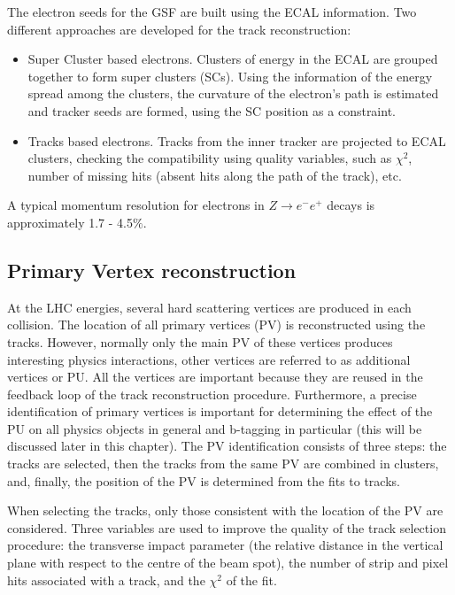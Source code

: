 The electron seeds for the GSF are built using the ECAL information. Two different approaches are developed for the track reconstruction:

\begin{itemize}

\item Super Cluster based electrons. Clusters of energy in the ECAL are grouped together to form super clusters (SCs). Using the information of the energy spread among the clusters, the curvature of the electron's path is estimated and tracker seeds are formed, using the SC position as a constraint. 
\item Tracks based electrons. Tracks from the inner tracker are projected to ECAL clusters, checking the compatibility using quality variables, such as $\chi^2$, number of missing hits (absent hits along the path of the track), etc. 
\end{itemize}

A typical momentum resolution for electrons in $Z \rightarrow e^- e^+$ decays is approximately 1.7 - 4.5$\%$.

\subsection{Primary Vertex reconstruction}\label{sec:PV_reconstruction}

At the LHC energies, several hard scattering vertices are produced in each collision. The location of all primary vertices (PV) is reconstructed using the tracks. However, normally only the main PV of these vertices produces interesting physics interactions, other vertices are referred to as additional vertices or PU. All the vertices are important because they are reused in the feedback loop of the track reconstruction procedure. Furthermore, a precise identification of primary vertices is important for determining the effect of the PU on all physics objects in general and b-tagging in particular (this will be discussed later in this chapter). The PV identification consists of three steps: the tracks are selected, then the tracks from the same PV are combined in clusters, and, finally, the position of the PV is determined from the fits to tracks. 

When selecting the tracks, only those consistent with the location of the PV are considered. Three variables are used to improve the quality of the track selection procedure: the transverse impact parameter (the relative distance in the vertical plane with respect to the centre of the beam spot), the number of strip and pixel hits associated with a track, and the $\chi^2$ of the fit.

